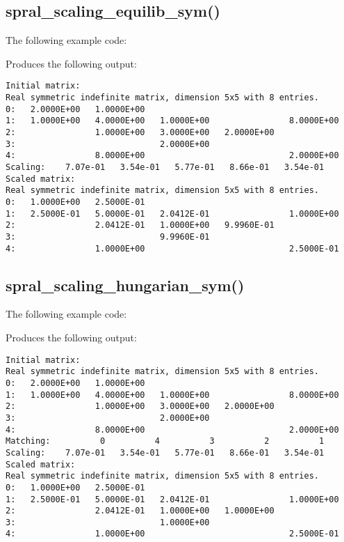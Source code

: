 \subsection{spral\_scaling\_equilib\_sym()}
The following example code:

Produces the following output:
\begin{verbatim}
Initial matrix:
Real symmetric indefinite matrix, dimension 5x5 with 8 entries.
0:   2.0000E+00   1.0000E+00                                       
1:   1.0000E+00   4.0000E+00   1.0000E+00                8.0000E+00
2:                1.0000E+00   3.0000E+00   2.0000E+00             
3:                             2.0000E+00                          
4:                8.0000E+00                             2.0000E+00
Scaling:    7.07e-01   3.54e-01   5.77e-01   8.66e-01   3.54e-01
Scaled matrix:
Real symmetric indefinite matrix, dimension 5x5 with 8 entries.
0:   1.0000E+00   2.5000E-01                                       
1:   2.5000E-01   5.0000E-01   2.0412E-01                1.0000E+00
2:                2.0412E-01   1.0000E+00   9.9960E-01             
3:                             9.9960E-01                          
4:                1.0000E+00                             2.5000E-01
\end{verbatim}

\subsection{spral\_scaling\_hungarian\_sym()}
The following example code:

Produces the following output:
\begin{verbatim}
Initial matrix:
Real symmetric indefinite matrix, dimension 5x5 with 8 entries.
0:   2.0000E+00   1.0000E+00                                       
1:   1.0000E+00   4.0000E+00   1.0000E+00                8.0000E+00
2:                1.0000E+00   3.0000E+00   2.0000E+00             
3:                             2.0000E+00                          
4:                8.0000E+00                             2.0000E+00
Matching:          0          4          3          2          1
Scaling:    7.07e-01   3.54e-01   5.77e-01   8.66e-01   3.54e-01
Scaled matrix:
Real symmetric indefinite matrix, dimension 5x5 with 8 entries.
0:   1.0000E+00   2.5000E-01                                       
1:   2.5000E-01   5.0000E-01   2.0412E-01                1.0000E+00
2:                2.0412E-01   1.0000E+00   1.0000E+00             
3:                             1.0000E+00                          
4:                1.0000E+00                             2.5000E-01
\end{verbatim}
